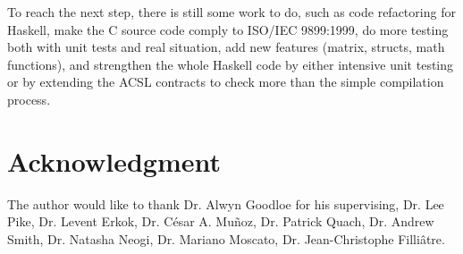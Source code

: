 \documentclass[a4paper,11pt,final]{article}
\begin{document}
	To reach the next step, there is still some work to do, such as code refactoring for Haskell, make the C source code comply to ISO/IEC 9899:1999, do more testing both with unit tests and real situation, add new features (matrix, structs, math functions), and strengthen the whole Haskell code by either intensive unit testing or by extending the ACSL contracts to check more than the simple compilation process.
	
	
	\cleardoublepage{}
\begin{minipage}{\textwidth}
	\footnotesize
	
	
\end{minipage}
	
	\section*{Acknowledgment}
	
	The author would like to thank Dr. Alwyn Goodloe for his supervising, Dr. Lee Pike, Dr. Levent Erkok, Dr. César A. Muñoz, Dr. Patrick Quach, Dr. Andrew Smith, Dr. Natasha Neogi, Dr. Mariano Moscato, Dr. Jean-Christophe Filliâtre.
	
	\cleardoublepage
	
\end{document}
